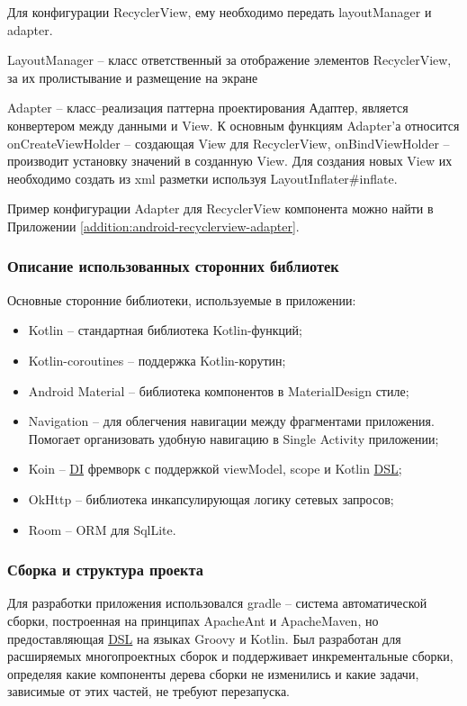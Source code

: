 Для конфигурации RecyclerView, ему необходимо передать layoutManager и adapter.

LayoutManager – класс ответственный за отображение элементов RecyclerView, за их пролистывание и размещение на экране

Adapter – класс–реализация паттерна проектирования Адаптер, является конвертером между данными и View.
К основным функциям Adapter’а относится onCreateViewHolder – создающая View для RecyclerView, onBindViewHolder – производит установку значений в созданную View.
Для создания новых View их необходимо создать из xml разметки используя LayoutInflater\#inflate.

Пример конфигурации Adapter для RecyclerView компонента можно найти в Приложении \ref{addition:android-recyclerview-adapter}.

\subsubsection{Описание использованных сторонних библиотек}\indent

Основные сторонние библиотеки, используемые в приложении:

\begin{itemize}
    \item Kotlin – стандартная библиотека Kotlin-функций;
    \item Kotlin-coroutines – поддержка Kotlin-корутин;
    \item Android Material – библиотека компонентов в MaterialDesign стиле;
    \item Navigation – для облегчения навигации между фрагментами приложения. Помогает организовать удобную навигацию в Single Activity приложении;
    \item Koin – \hyperlink{gloss:di}{DI} фремворк с поддержкой viewModel, scope и Kotlin \hyperlink{gloss:dsl}{DSL};
    \item OkHttp – библиотека инкапсулирующая логику сетевых запросов;
    \item Room – ORM для SqlLite.
\end{itemize}

\subsubsection{Сборка и структура проекта}\indent

Для разработки приложения использовался gradle – система автоматической сборки, построенная на принципах ApacheAnt и ApacheMaven, но предоставляющая \hyperlink{gloss:dsl}{DSL} на языках Groovy и Kotlin.
Был разработан для расширяемых многопроектных сборок и поддерживает инкрементальные сборки, определяя какие компоненты дерева сборки не изменились и какие задачи, зависимые от этих частей, не требуют перезапуска.

